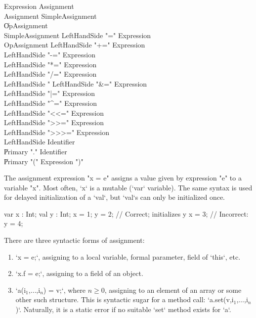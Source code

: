 \begin{grammar}
Expression \: Assignment \\
Assignment \: SimpleAssignment \\
           \| OpAssignment \\
SimpleAssignment \: LeftHandSide \xcd"=" Expression \\
OpAssignment \: LeftHandSide \xcd"+=" Expression \\
             \: LeftHandSide \xcd"-=" Expression \\
             \: LeftHandSide \xcd"*=" Expression \\
             \: LeftHandSide \xcd"/=" Expression \\
             \: LeftHandSide \xcd"%
             \: LeftHandSide \xcd"&=" Expression \\
             \: LeftHandSide \xcd"|=" Expression \\
             \: LeftHandSide \xcd"^=" Expression \\
             \: LeftHandSide \xcd"<<=" Expression \\
             \: LeftHandSide \xcd">>=" Expression \\
             \: LeftHandSide \xcd">>>=" Expression \\
LeftHandSide \: Identifier \\
             \| Primary \xcd"." Identifier \\
             \| Primary \xcd"(" Expression \xcd")" \\
\end{grammar}



The assignment expression \xcd"x = e" assigns a value given by
expression \xcd"e"
to a variable \xcd"x".  
Most often, \xcd`x` is a mutable (\xcd`var` variable).  The same syntax is
used for delayed initialization of a \xcd`val`, but \xcd`val`s can only be
initialized once.
\begin{xten}
  var x : Int;
  val y : Int;
  x = 1;
  y = 2; // Correct; initializes y
  x = 3; 
  // Incorrect: y = 4;
\end{xten}


There are three syntactic forms of
assignment: 
\begin{enumerate}
\item \xcd`x = e;`, assigning to a local variable, formal parameter, field of
      \xcd`this`, etc. 
\item \xcd`x.f = e;`, assigning to a field of an object.
\item \xcdmath`a(i$_1$,$\ldots$,i$_n$) = v;`, where {$n \ge 0$}, assigning to
      an element of an array or some other such structure. This is syntactic
      sugar for a method call: \xcdmath`a.set(v,i$_1$,$\ldots$,i$_n$)`.
      Naturally, it is a static error if no suitable \xcd`set` method exists
      for \xcd`a`.
\end{enumerate}

